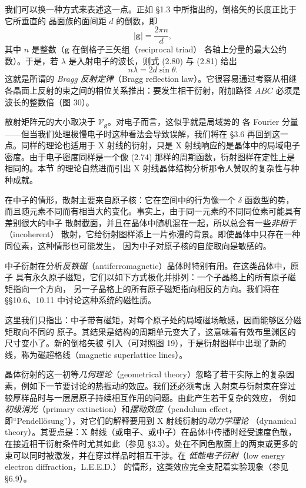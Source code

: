 我们可以换一种方式来表述这一点。正如 §1.3 中所指出的，倒格矢的长度正比于它所垂直的
晶面族的面间距 $d$ 的倒数，即
\begin{equation*}
|\mathbf{g}| = \frac{2\pi n}{d},
\tag{2.81}
\end{equation*}
其中 $n$ 是整数（$\mathbf{g}$ 在倒格子三矢组（reciprocal triad）
各轴上分量的最大公约数）。于是，若 $\lambda$ 是入射电子的波长，则式 (2.80) 与
(2.81) 给出
\begin{equation*}
n\lambda = 2d\sin\theta.
\tag{2.82}
\end{equation*}
这就是所谓的 \emph{Bragg 反射定律}（Bragg reflection law）。它很容易通过考察从相继
各晶面上反射的束之间的相位关系推出：要发生相干衍射，附加路径 $ABC$
必须是波长的整数倍（图 30）。

散射矩阵元的大小取决于 $\mathcal{V}_{\mathbf{g}}$。对电子而言，这似乎就是局域势的
各 Fourier 分量——但当我们处理极慢电子时这种看法会导致误解，我们将在 §3.6
再回到这一点。同样的理论也适用于 X 射线的衍射，只是 X 射线响应的是晶体中的局域电子
密度。由于电子密度同样是一个像 (2.74) 那样的周期函数，衍射图样在定性上是相同的。本节
的理论自然进而引出 X 射线晶体结构分析那令人赞叹的复杂性与种种成就。

在中子的情形，散射主要来自原子核：它在空间中的行为像一个 $\delta$
函数型的势，而且随元素不同而有相当大的变化。事实上，由于同一元素的不同同位素可能具有
差别很大的中子
散射截面，并且在晶体中随机混在一起，所以总会有一些\emph{非相干}（incoherent）
散射，它给衍射图样添上一片弥漫的背景。即使晶体中只存在一种同位素，这种情形也可能发生，
因为中子对原子核的自旋取向是敏感的。

中子衍射在分析\emph{反铁磁}（antiferromagnetic）晶体时特别有用。在这类晶体中，原子
具有永久原子磁矩，它们以如下方式极化并排列：一个子晶格上的所有原子磁矩指向一个方向，
另一子晶格上的所有原子磁矩指向相反的方向。我们将在 §§10.6、10.11
中讨论这种系统的磁性质。

这里我们只指出：中子带有磁矩，对每个原子处的局域磁场敏感，因而能够区分磁矩取向不同的
原子。其结果是结构的周期单元变大了，这意味着有效布里渊区的尺寸变小了。新的倒格矢被
引入（可对照图 19），于是衍射图样中出现了新的线，称为磁超格线（magnetic
superlattice lines）。

晶体衍射的这一初等\emph{几何理论}（geometrical
theory）忽略了若干实际上的复杂因素，例如下一节要讨论的热振动的效应。我们还必须考虑
入射束与衍射束在穿过较厚样品时与一层层原子持续相互作用的问题。由此产生若干复杂的效应，
例如\emph{初级消光}（primary extinction）和\emph{摆动效应}（pendulum
effect，即“Pendellösung”），对它们的解释要用到 X 射线衍射的\emph{动力学理论}
（dynamical theory）。其要点是：X
射线（或电子、或中子）在晶体中传播时经受速度色散，在接近相干衍射条件时尤其如此（参见
§3.3）。处在不同色散面上的两束或更多的束可以同时被激发，并在穿过样品时相互干涉。在
\emph{低能电子衍射}（low energy electron diffraction，L.E.E.D.）
的情形，这类效应完全支配着实验现象（参见 §6.9）。

